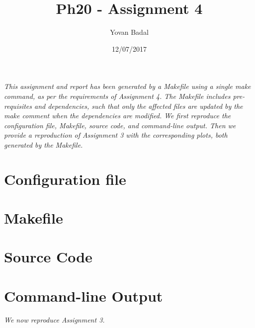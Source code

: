 \documentclass[11pt]{article}
\begin{document}
	\title{Ph20 - Assignment 4}
	\author{Yovan Badal}
	\date{12/07/2017}
	\maketitle
	
\textit{This assignment and report has been generated by a Makefile using a single make command, as per the requirements of Assignment 4. The Makefile includes pre-requisites and dependencies, such that only the affected files are updated by the make comment when the dependencies are modified. We first reproduce the configuration file, Makefile, source code, and command-line output. Then we provide a reproduction of Assignment 3 with the corresponding plots, both generated by the Makefile.}
\section*{Configuration file}


\newpage
\section*{Makefile}


\section*{Source Code}


\section*{Command-line Output}

\newpage

\textit{We now reproduce Assignment 3.}
\end{document}
